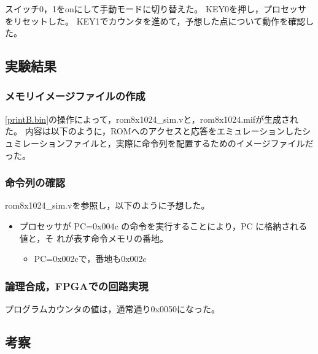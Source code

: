 スイッチ0，1をonにして手動モードに切り替えた。
KEY0を押し，プロセッサをリセットした。
KEY1でカウンタを進めて，予想した点について動作を確認した。

\subsection{実験結果}
\subsubsection{メモリイメージファイルの作成}
\ref{printB.bin}の操作によって，rom8x1024\_sim.vと，rom8x1024.mifが生成された。
内容は以下のように，ROMへのアクセスと応答をエミュレーションしたシュミレーションファイルと，実際に命令列を配置するためのイメージファイルだった。

\subsubsection{命令列の確認}
rom8x1024\_sim.vを参照し，以下のように予想した。
\begin{itemize}
  \item プロセッサが PC=0x004c の命令を実行することにより，PC に格納される値と，そ
  れが表す命令メモリの番地。
  \begin{itemize}
    \item PC=0x002cで，番地も0x002c
  \end{itemize}
\end{itemize}

\subsubsection{論理合成，FPGAでの回路実現}
プログラムカウンタの値は，通常通り0x0050になった。

\subsection{考察}

